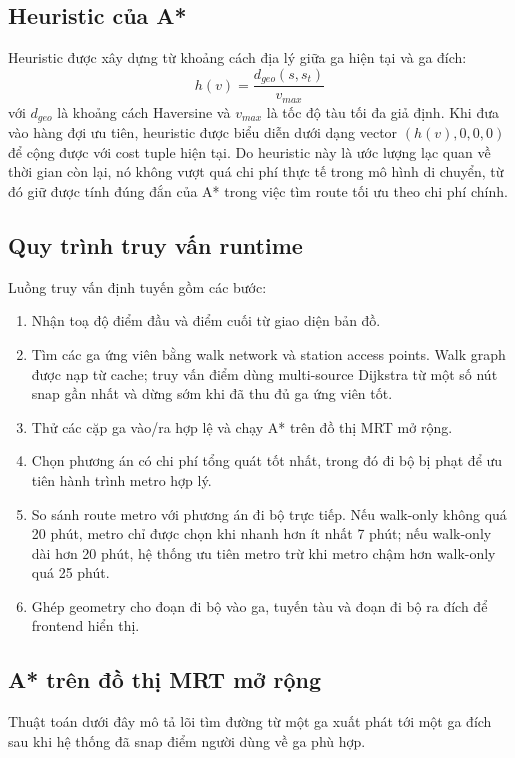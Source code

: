 \documentclass[../DoAn.tex]{subfiles}
\begin{document}
\subsection{Heuristic của A*}
Heuristic được xây dựng từ khoảng cách địa lý giữa ga hiện tại và ga đích:
\[
h(v) = \frac{d_{geo}(s, s_t)}{v_{max}}
\]
với \(d_{geo}\) là khoảng cách Haversine và \(v_{max}\) là tốc độ tàu tối đa giả định.
Khi đưa vào hàng đợi ưu tiên, heuristic được biểu diễn dưới dạng vector \((h(v),0,0,0)\) để cộng được với cost tuple hiện tại.
Do heuristic này là ước lượng lạc quan về thời gian còn lại, nó không vượt quá chi phí thực tế trong mô hình di chuyển, từ đó giữ được tính đúng đắn của A* trong việc tìm route tối ưu theo chi phí chính.

\subsection{Quy trình truy vấn runtime}
Luồng truy vấn định tuyến gồm các bước:
\begin{enumerate}
    \item Nhận toạ độ điểm đầu và điểm cuối từ giao diện bản đồ.
    \item Tìm các ga ứng viên bằng walk network và station access points. Walk graph được nạp từ cache; truy vấn điểm dùng multi-source Dijkstra từ một số nút snap gần nhất và dừng sớm khi đã thu đủ ga ứng viên tốt.
    \item Thử các cặp ga vào/ra hợp lệ và chạy A* trên đồ thị MRT mở rộng.
    \item Chọn phương án có chi phí tổng quát tốt nhất, trong đó đi bộ bị phạt để ưu tiên hành trình metro hợp lý.
    \item So sánh route metro với phương án đi bộ trực tiếp. Nếu walk-only không quá 20 phút, metro chỉ được chọn khi nhanh hơn ít nhất 7 phút; nếu walk-only dài hơn 20 phút, hệ thống ưu tiên metro trừ khi metro chậm hơn walk-only quá 25 phút.
    \item Ghép geometry cho đoạn đi bộ vào ga, tuyến tàu và đoạn đi bộ ra đích để frontend hiển thị.
\end{enumerate}

\subsection{A* trên đồ thị MRT mở rộng}
Thuật toán dưới đây mô tả lõi tìm đường từ một ga xuất phát tới một ga đích sau khi hệ thống đã snap điểm người dùng về ga phù hợp.
\end{document}
